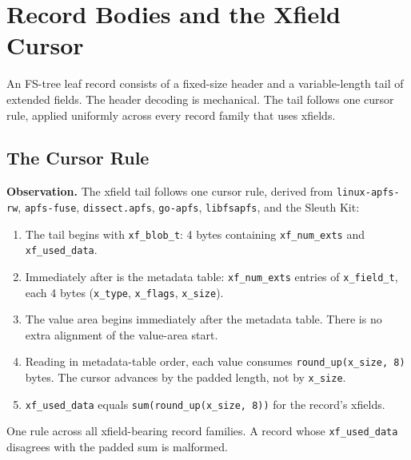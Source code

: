 \chapter{Record Bodies and the Xfield Cursor}
\label{ssec:xfield-spec-vs-impl}

An FS-tree leaf record consists of a fixed-size header and a
variable-length tail of extended fields. The header decoding is
mechanical. The tail follows one cursor rule, applied uniformly
across every record family that uses xfields.

\section{The Cursor Rule}

\textbf{Observation.} The xfield tail follows one cursor rule, derived
from \texttt{linux-apfs-rw}, \texttt{apfs-fuse}, \texttt{dissect.apfs},
\texttt{go-apfs}, \texttt{libfsapfs}, and the Sleuth Kit:

\begin{enumerate}
  \item The tail begins with \texttt{xf\_blob\_t}: 4 bytes containing
    \texttt{xf\_num\_exts} and \texttt{xf\_used\_data}.
  \item Immediately after is the metadata table:
    \texttt{xf\_num\_exts} entries of \texttt{x\_field\_t}, each 4
    bytes (\texttt{x\_type}, \texttt{x\_flags}, \texttt{x\_size}).
  \item The value area begins immediately after the metadata table.
    There is no extra alignment of the value-area start.
  \item Reading in metadata-table order, each value consumes
    \texttt{round\_up(x\_size, 8)} bytes. The cursor advances by the
    padded length, not by \texttt{x\_size}.
  \item \texttt{xf\_used\_data} equals
    \texttt{sum(round\_up(x\_size, 8))} for the record's xfields.
\end{enumerate}

One rule across all xfield-bearing record families. A record whose
\texttt{xf\_used\_data} disagrees with the padded sum is malformed.

